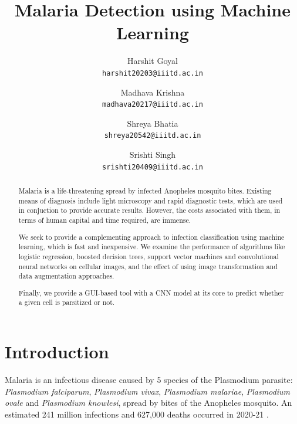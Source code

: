 \documentclass[10pt,twocolumn,letterpaper]{article}
\begin{document}
\title{Malaria Detection using Machine Learning}

\author{Harshit Goyal\\
{\tt\small harshit20203@iiitd.ac.in}
\and
Madhava Krishna\\
{\tt\small madhava20217@iiitd.ac.in}
\and
Shreya Bhatia\\
{\tt\small shreya20542@iiitd.ac.in}
\and
Srishti Singh\\
{\tt\small srishti20409@iiitd.ac.in}
}

\maketitle

\begin{abstract}
   Malaria is a life-threatening spread by infected Anopheles mosquito bites. Existing means of diagnosis include light microscopy and rapid diagnostic tests, which are used in conjuction to provide accurate results. However, the costs associated with them, in terms of human capital and time required, are immense.
   
   We seek to provide a complementing approach to infection classification using machine learning, which is fast and inexpensive. We examine the performance of algorithms like logistic regression, boosted decision trees, support vector machines and convolutional neural networks on cellular images, and the  effect of using image transformation and data augmentation approaches.

   Finally, we provide a GUI-based tool with a CNN model at its core to predict whether a given cell is parsitized or not.
\end{abstract}

\section{Introduction}

Malaria is an infectious disease caused by 5 species of the Plasmodium parasite: \textit{Plasmodium falciparum}, \textit{Plasmodium vivax}, \textit{Plasmodium malariae}, \textit{Plasmodium ovale} and \textit{Plasmodium knowlesi}, spread by bites of the Anopheles mosquito. An estimated 241 million infections and 627,000 deaths occurred in 2020-21 \cite{worldmalaria}. 
\end{document}

